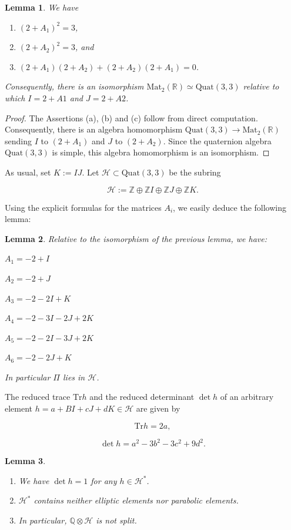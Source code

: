 \documentclass[12pt]{amsart}
\newcommand{\Q}{\mathbb{Q}}
\newcommand{\R}{\mathbb{R}}
\newcommand{\Z}{\mathbb{Z}}
\newcommand{\Mat}{\mathrm{Mat}}
\newcommand{\Quat}{{\mathrm {Quat}}}
\newcommand{\Tr}{{\mathrm {Tr}}}
\newtheorem{lemma}{Lemma}
\newcommand{\cH}{\mathcal{H}}
\begin{document}
\begin{lemma}\label{quaternion} We have
\begin{enumerate}
\item[(a)] $(2+A_1)^2=3$,
\item[(b)] $(2+A_2)^2=3$, and
\item[(c)] $(2+A_1)(2+A_2)+(2+A_2)(2+A_1)=0$.
\end{enumerate}
Consequently, there is an isomorphism 
$\Mat_2(\R)\simeq \Quat(3,3)$ relative to which
$I=2+A1$ and $J=2+A2$.
\end{lemma}

\begin{proof} The Assertions (a), (b) and (c) follow from direct computation. Consequently, there is an algebra homomorphism
$\Quat(3,3)\to \Mat_2(\R)$ sending $I$ to $(2+A_1)$ and
$J$ to $(2+A_2)$. Since the quaternion algebra $\Quat(3,3)$ is simple, this algebra homomorphism is an isomorphism.
\end{proof}

As usual, set $K:=IJ$. Let $\cH\subset \Quat(3,3)$ be the subring

$$\cH:=\Z\oplus\Z I\oplus\Z J\oplus \Z K.$$

Using the explicit formulas for the matrices $A_i$, we easily deduce the following lemma:

\begin{lemma} Relative to the isomorphism of the previous lemma, we have:

$A_1=-2+I$

$A_2=-2+J$

$A_3=-2-2I+K$

$A_4=-2-3I-2J+2K$

$A_5=-2-2I-3J+2K$

$A_6=-2-2J+K$

In particular $\Pi$ lies in $\cH$.
\end{lemma}



The reduced  trace $\Tr h$ and the reduced determinant $\det h$ of an arbitrary element  $h=a+BI+cJ+dK\in\cH$ are given by

$$\Tr h= 2a,$$

$$\det h= a^2 -3b^2 -3 c^2 +9d^2.$$






\begin{lemma} \label{H*}

\begin{enumerate}
\item[(a)] We have $\det h=1$  for any $h\in\cH^*$.
\item[(b)] $\cH^*$ contains neither elliptic elements nor
parabolic elements.
\item[(c)] In particular, $\Q\otimes\cH$ is not split.
\end{enumerate}

\end{lemma}
\end{document}
